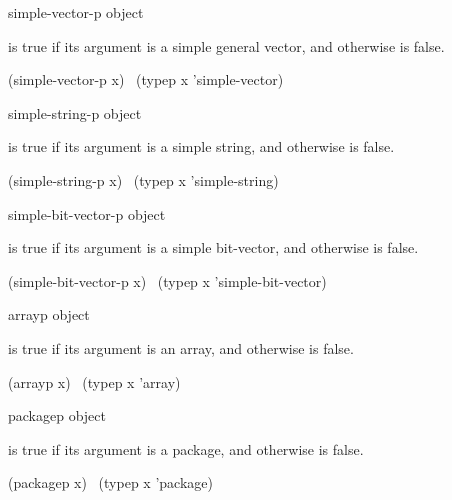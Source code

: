 \begin{defun}[Function]
simple-vector-p object

 is true if its argument is a simple general vector,
and otherwise is false.
\begin{lisp}
(simple-vector-p x) \EQ\ (typep x 'simple-vector)
\end{lisp}
\end{defun}

\begin{defun}[Function]
simple-string-p object

 is true if its argument is a simple string,
and otherwise is false.
\begin{lisp}
(simple-string-p x) \EQ\ (typep x 'simple-string)
\end{lisp}
\end{defun}

\begin{defun}[Function]
simple-bit-vector-p object

 is true if its argument is a simple bit-vector,
and otherwise is false.
\begin{lisp}
(simple-bit-vector-p x) \EQ\ (typep x 'simple-bit-vector)
\end{lisp}
\end{defun}

\begin{defun}[Function]
arrayp object

 is true if its argument is an array,
and otherwise is false.
\begin{lisp}
(arrayp x) \EQ\ (typep x 'array)
\end{lisp}
\end{defun}

\begin{defun}[Function]
packagep object

 is true if its argument is a package,
and otherwise is false.
\begin{lisp}
(packagep x) \EQ\ (typep x 'package)
\end{lisp}
\end{defun}

